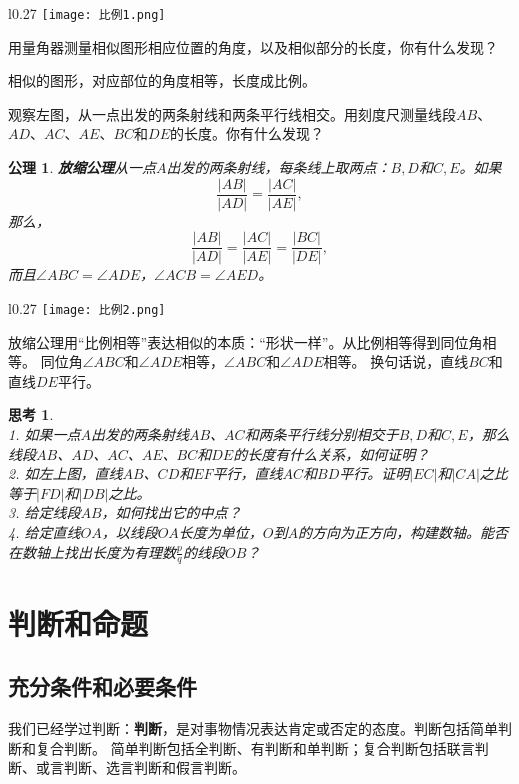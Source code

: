 \documentclass[12pt,UTF8]{ctexbook}
\newtheorem{sk}{思考}[section]
\newtheorem{po}{公理}
\begin{document}
\begin{wrapfigure}{l}{0.27\textwidth} %
    \vspace{-30pt}
    \flushleft
    \texttt{[image: 比例1.png]}
\end{wrapfigure}

用量角器测量相似图形相应位置的角度，以及相似部分的长度，你有什么发现？

相似的图形，对应部位的角度相等，长度成比例。

观察左图，从一点出发的两条射线和两条平行线相交。用刻度尺测量线段$AB$、$AD$、$AC$、$AE$、$BC$和$DE$的长度。你有什么发现？

\begin{po}{\textbf{放缩公理}}\label{po:6}
    从一点$A$出发的两条射线，每条线上取两点：$B,D$和$C,E$。如果
    $$ \frac{|AB|}{|AD|} = \frac{|AC|}{|AE|},$$
    那么，
    $$ \frac{|AB|}{|AD|} = \frac{|AC|}{|AE|} = \frac{|BC|}{|DE|},$$
    而且$\angle ABC = \angle ADE$，$\angle ACB = \angle AED$。
\end{po}
\begin{wrapfigure}{l}{0.27\textwidth} %
    \texttt{[image: 比例2.png]}
\end{wrapfigure}

放缩公理用“比例相等”表达相似的本质：“形状一样”。从比例相等得到同位角相等。
同位角$\angle ABC$和$\angle ADE$相等，$\angle ABC$和$\angle ADE$相等。
换句话说，直线$BC$和直线$DE$平行。

\begin{sk}\label{sk:1-2-0}
    \mbox{}\\
    1. 如果一点$A$出发的两条射线$AB$、$AC$和两条平行线分别相交于$B,D$和$C,E$，那么线段$AB$、$AD$、$AC$、$AE$、$BC$和$DE$的长度有什么关系，如何证明？\\
    2. 如左上图，直线$AB$、$CD$和$EF$平行，直线$AC$和$BD$平行。证明$|EC|$和$|CA|$之比等于$|FD|$和$|DB|$之比。\\
    3. 给定线段$AB$，如何找出它的中点？\\
    4. 给定直线$OA$，以线段$OA$长度为单位，$O$到$A$的方向为正方向，构建数轴。能否在数轴上找出长度为有理数$\frac{p}{q}$的线段$OB$？
\end{sk}

\chapter{判断和命题}
\section{充分条件和必要条件}
我们已经学过判断：\textbf{判断}，是对事物情况表达肯定或否定的态度。判断包括简单判断和复合判断。
简单判断包括全判断、有判断和单判断；复合判断包括联言判断、或言判断、选言判断和假言判断。
\end{document}
